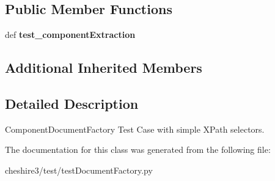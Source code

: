 \subsection*{Public Member Functions}
\begin{DoxyCompactItemize}
\item 
\hypertarget{classcheshire3_1_1test_1_1test_document_factory_1_1_component_document_factory_test_case_acc33b0a953a19eb4148fbe1eb7ddf09e}{def {\bfseries test\-\_\-component\-Extraction}}\label{classcheshire3_1_1test_1_1test_document_factory_1_1_component_document_factory_test_case_acc33b0a953a19eb4148fbe1eb7ddf09e}

\end{DoxyCompactItemize}
\subsection*{Additional Inherited Members}


\subsection{Detailed Description}
\begin{DoxyVerb}ComponentDocumentFactory Test Case with simple XPath selectors.\end{DoxyVerb}
 

The documentation for this class was generated from the following file\-:\begin{DoxyCompactItemize}
\item 
cheshire3/test/test\-Document\-Factory.\-py\end{DoxyCompactItemize}
